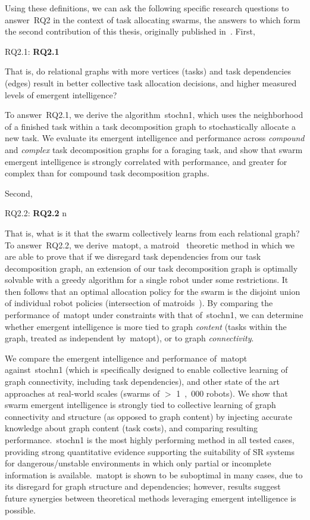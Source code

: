 Using these definitions, we can ask the following specific research questions to
answer~\gls{RQ2} in the context of task allocating swarms, the answers to which
form the second contribution of this thesis, originally published
in~\cite{Harwell2020a}. First,

\medskip\noindent
\gls{RQ2.1}: \textbf{\Glsdesc{RQ2.1}}
\medskip

\noindent
That is, do relational graphs with more vertices (tasks) and task dependencies
(edges) result in better collective task allocation decisions, and higher
measured levels of emergent intelligence?

To answer~\gls{RQ2.1}, we derive the algorithm~\gls{stochn1}, which uses the
neighborhood of a finished task within a task decomposition graph to
stochastically allocate a new task. We evaluate its emergent intelligence and
performance across \emph{compound} and \emph{complex} task decomposition graphs
for a foraging task, and show that swarm emergent intelligence is strongly
correlated with performance, and greater for complex than for compound task
decomposition graphs.

Second,

\medskip\noindent
\gls{RQ2.2}: \textbf{\Glsdesc{RQ2.2}}
n\medskip

\noindent
That is, what is it that the swarm collectively learns from each relational
graph?  To answer~\gls{RQ2.2}, we derive~\gls{matopt}, a
matroid~\cite{Tutte1959,Whitney1935,Oxley2006} theoretic method in which we are
able to prove that if we disregard task dependencies from our task decomposition
graph, an extension of our task decomposition graph is optimally solvable with a
greedy algorithm for a single robot under some restrictions. It then follows
that an optimal allocation policy for the swarm is the disjoint union of
individual robot policies (intersection of matroids~\cite{Williams2017}). By
comparing the performance of~\gls{matopt} under constraints with that
of~\gls{stochn1}, we can determine whether emergent intelligence is more tied
to graph \emph{content} (tasks within the graph, treated as independent
by~\gls{matopt}), or to graph \emph{connectivity}.

We compare the emergent intelligence and performance of~\gls{matopt}
against~\gls{stochn1} (which is specifically designed to enable collective
learning of graph connectivity, including task dependencies), and other state of
the art approaches at real-world scales (swarms of $>$ \unit{1,000} robots). We
show that swarm emergent intelligence is strongly tied to collective learning of
graph connectivity and structure (as opposed to graph content) by injecting
accurate knowledge about graph content (task costs), and comparing resulting
performance.~\gls{stochn1} is the most highly performing method in all tested
cases, providing strong quantitative evidence supporting the suitability of SR
systems for dangerous/unstable environments in which only partial or incomplete
information is available.~\gls{matopt} is shown to be suboptimal in many cases,
due to its disregard for graph structure and dependencies; however, results
suggest future synergies between theoretical methods leveraging emergent
intelligence is possible.

